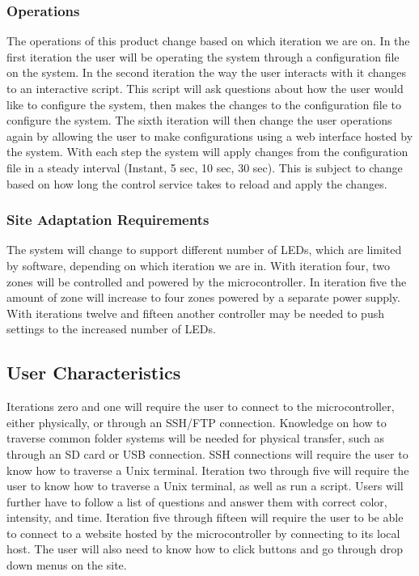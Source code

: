 \documentclass[onecolumn, draftclsnofoot,10pt, compsoc]{IEEEtran}
\begin{document}
			\subsubsection{Operations}
				The operations of this product change based on which iteration we are on. In the first iteration the user will be operating the system through a configuration file on the system. In the second iteration
				the way the user interacts with it changes to an interactive script. This script will ask questions about how the user would like to configure the system, then makes the changes to the configuration file to configure the system.
				The sixth iteration will then change the user operations again by allowing the user to make configurations using a web interface hosted by the system. With each step the system will apply changes from the configuration file
				in a steady interval (Instant, 5 sec, 10 sec, 30 sec). This is subject to change based on how long the control service takes to reload and apply the changes.
			\subsubsection{Site Adaptation Requirements}
				The system will change to support different number of LEDs, which are limited by software, depending on which iteration we are in. With iteration four, two zones will be controlled and powered by the microcontroller.
				In iteration five the amount of zone will increase to four zones powered by a separate power supply. With iterations twelve and fifteen another controller may be needed to push settings to the increased number of LEDs.


		\subsection{User Characteristics}
		Iterations zero and one will require the user to connect to the microcontroller, either physically, or through an SSH/FTP connection. Knowledge on how to traverse common folder systems will be needed for physical transfer, such as
		through an SD card or USB connection. SSH connections will require the user to know how to traverse a Unix terminal.
		Iteration two through five will require the user to know how to traverse a Unix terminal, as well as run a script. Users will further have to follow a list of questions and answer them with correct color, intensity, and time.
		Iteration five through fifteen will require the user to be able to connect to a website hosted by the microcontroller by connecting to its local host. The user will also need to know how to click buttons and go through drop down menus on the site.
\end{document}
